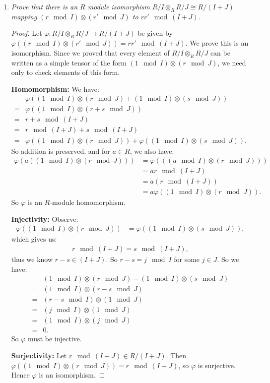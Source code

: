 \documentclass[12pt]{amsbook}
\theoremstyle{plain}
\numberwithin{section}{chapter}
\numberwithin{equation}{chapter}
\theoremstyle{definition}
\theoremstyle{remark}
\newcommand{\bee}{\begin{equation}\begin{aligned}}
\newcommand{\eee}{\end{aligned}\end{equation}}
\newcommand{\tens}{\otimes}
\renewcommand{\phi}{\varphi}
\begin{document}
\begin{enumerate}[label=\arabic*.]
\begin{enumerate}
\item \textit{Prove that there is an $R$ module isomorphism $R/I \tens_R R/J \cong R/(I + J)$ mapping $(r \mod I) \tens (r' \mod J)$ to $rr' \mod (I + J)$. }

\begin{proof}
Let $\phi: R/I \tens_R R/J \to R/(I + J)$ be given by $\phi((r \mod I) \tens (r' \mod J)) = rr' \mod (I + J)$. We prove this is an isomorphism. Since we proved that every element of $ R/I \tens_R R/J$ can be written as a simple tensor of the form $(1 \mod I) \tens (r \mod J)$, we need only to check elements of this form.

\textbf{Homomorphism: } We have: 
\bee
&\phi((1 \mod I) \tens (r \mod J) + (1 \mod I) \tens (s \mod J))\\
=&\phi((1 \mod I) \tens (r + s \mod J))\\
=&r + s \mod (I + J)\\
=&r \mod (I + J) + s \mod (I+ J)\\
=&\phi((1 \mod I) \tens (r \mod J)) + \phi((1 \mod I) \tens (s \mod J)).
\eee
So addition is preserved, and for $a \in R$, we also have: 
\bee
\phi(a((1 \mod I) \tens (r \mod J))) &= \phi(((a \mod I) \tens (r \mod J)))\\
&= ar \mod (I + J)\\
&= a(r \mod (I + J))\\
&= a \phi((1 \mod I) \tens (r \mod J)).
\eee
So $\phi$ is an $R$-module homomorphism. 

\textbf{Injectivity: }Observe: 
\bee
\phi((1 \mod I) \tens (r \mod J)) &= \phi((1 \mod I) \tens (s \mod J)),
\eee
which gives us: 
\bee
r \mod (I + J) = s \mod (I + J),
\eee
thus we know $r - s \in (I + J)$. So $r - s = j \mod I$ for some $j \in J$. So we have: 
\bee
&(1 \mod I) \tens (r \mod J) - (1 \mod I) \tens (s \mod J)\\
=&(1 \mod I) \tens (r - s \mod J)\\
=&(r - s \mod I) \tens (1 \mod J)\\
=&(j \mod I) \tens (1 \mod J)\\
=&(1 \mod I) \tens (j \mod J)\\
=& 0.
\eee
So $\phi$ must be injective. 

\textbf{Surjectivity: }Let $r \mod (I + J) \in R/(I+ J)$. Then $\phi((1 \mod I) \tens (r \mod J)) = r \mod (I + J)$, so $\phi$ is surjective. Hence $\phi$ is an isomorphism. 
\end{proof} 
\end{enumerate}


\end{enumerate}
\end{document}
